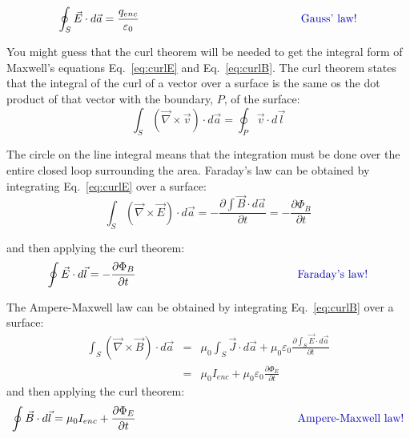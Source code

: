 \documentclass[12pt]{article}
\begin{document}
\begin{flushleft}
\begin{equation*}
\oint_{S} \vec{E} \cdot d\vec{a} = \frac{q_{enc}}{\varepsilon_{0}} \hspace{2.in} \mbox{\color{myblue} Gauss' law!} 
\end{equation*}

You might guess that the curl theorem will be needed to get the integral form of Maxwell's equations Eq.~\ref{eq:curlE} and Eq.~\ref{eq:curlB}.  The curl theorem states that the integral of the curl of a vector over a surface is the same os the dot product of that vector with the boundary, $P$, of the surface:
\begin{equation*}
\int_{S} (\vec{\nabla}\times\vec{v}) \cdot d\vec{a} = \oint_{P} \vec{v} \cdot d\vec{l}
\end{equation*}

The circle on the line integral means that the integration must be done over the entire closed loop surrounding the area.   Faraday's law can be obtained by integrating Eq.~\ref{eq:curlE} over a surface:
\begin{equation*}
\int_{S} (\vec{\nabla} \times \vec{E}) \cdot d\vec{a}  =  -\frac{\partial \int \vec{B} \cdot d\vec{a} }{\partial t} = -\frac{\partial \Phi_{B} }{\partial t}
\end{equation*}

 and then applying the curl theorem:
\begin{equation*}
\oint \vec{E} \cdot d\vec{l}  =  -\frac{\partial \Phi_{B} }{\partial t} \hspace{2.in} \mbox{\color{myblue} Faraday's law!}
\end{equation*}

The Ampere-Maxwell law can be obtained by integrating Eq.~\ref{eq:curlB} over a surface:
  \begin{eqnarray*}
\int_{S} (\vec{\nabla} \times \vec{B}) \cdot d\vec{a}  & =  & \mu_{0}\int_{S} \vec{J} \cdot d\vec{a} + \mu_{0}\varepsilon_{0}\frac{\partial \int_{S} \vec{E} \cdot d\vec{a} }{\partial t} \\ 
& = & \mu_{0}I_{enc} + \mu_{0}\varepsilon_{0}\frac{\partial \Phi_{E} }{\partial t}
\end{eqnarray*}
and then applying the curl theorem:
  \begin{equation*}
\oint \vec{B} \cdot d\vec{l}  = \mu_{0}I_{enc} +\frac{\partial \Phi_{E} }{\partial t} \hspace{2.in} \mbox{\color{myblue} Ampere-Maxwell law!}
\end{equation*}


\end{flushleft}
\end{document}
